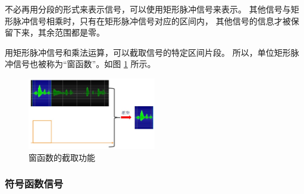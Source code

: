 \begin{remark}
    不必再用分段的形式来表示信号，可以使用矩形脉冲信号来表示。
    其他信号与矩形脉冲信号相乘时，只有在矩形脉冲信号对应的区间内，
    其他信号的信息才被保留下来，其余范围都是零。

    用矩形脉冲信号和乘法运算，可以截取信号的特定区间片段。
    所以，单位矩形脉冲信号也被称为``窗函数''。如图 \ref{fig:rect-pulse-signal-example} 所示。
    \begin{figure}[H]
        \centering
        \includegraphics[width=0.5\textwidth]{chap1/img/rect-pulse-signal-example.png}
        \caption{窗函数的截取功能}
        \label{fig:rect-pulse-signal-example}
    \end{figure}
\end{remark}

\subsubsection{符号函数信号}

